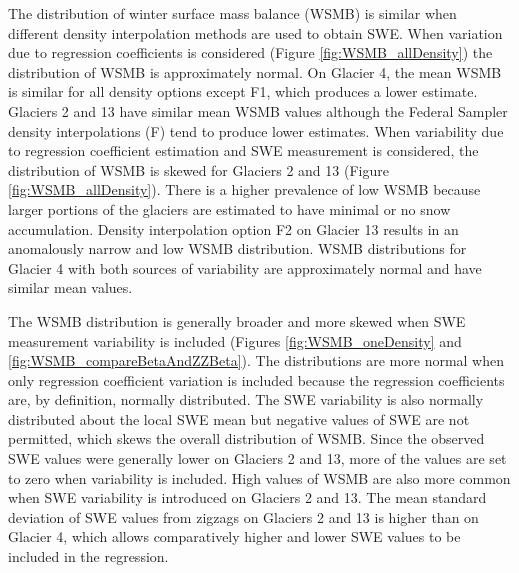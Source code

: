\documentclass[12pt]{article}
\begin{document}
The distribution of winter surface mass balance (WSMB) is similar when different density interpolation methods are used to obtain SWE. When variation due to regression coefficients is considered (Figure \ref{fig:WSMB_allDensity}) the distribution of WSMB is approximately normal. On Glacier 4, the mean WSMB is similar for all density options except F1, which produces a lower estimate. Glaciers 2 and 13 have similar mean WSMB values although the Federal Sampler density interpolations (F) tend to produce lower estimates. When variability due to regression coefficient estimation and SWE measurement is considered, the distribution of WSMB is skewed for Glaciers 2 and 13 (Figure \ref{fig:WSMB_allDensity}). There is a higher prevalence of low WSMB because larger portions of the glaciers are estimated to have minimal or no snow accumulation. Density interpolation option F2 on Glacier 13 results in an anomalously narrow and low WSMB distribution. WSMB distributions for Glacier 4 with both sources of variability are approximately normal and have similar mean values. 

The WSMB distribution is generally broader and more skewed when SWE measurement variability is included (Figures \ref{fig:WSMB_oneDensity} and \ref{fig:WSMB_compareBetaAndZZBeta}). The distributions are more normal when only regression coefficient variation is included because the regression coefficients are, by definition, normally distributed. The SWE variability is also normally distributed about the local SWE mean but negative values of SWE are not permitted, which skews the overall distribution of WSMB. Since the observed SWE values were generally lower on Glaciers 2 and 13, more of the values are set to zero when variability is included.  High values of WSMB are also more common when SWE variability is introduced on Glaciers 2 and 13. The mean standard deviation of SWE values from zigzags on Glaciers 2 and 13 is higher than on Glacier 4, which allows comparatively higher and lower SWE values to be included in the regression. 
\end{document}
